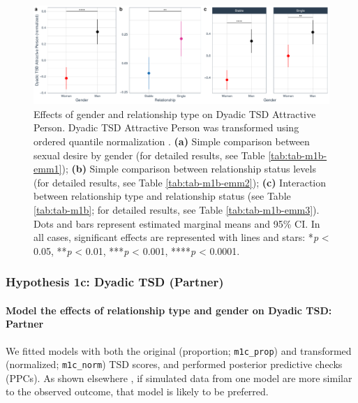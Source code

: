 \documentclass[
  bookmarksnumbered]{article}
\begin{document}
\begin{figure}
\centering
\includegraphics{Sexual_Desire_Arousal_files/figure-latex/fig-h1b-1.pdf}
\caption{\label{fig:fig-h1b}Effects of gender and relationship type on Dyadic TSD Attractive Person. Dyadic TSD Attractive Person was transformed using ordered quantile normalization \autocite{petersonOrderedQuantileNormalization2020a}. \textbf{(a)} Simple comparison between sexual desire by gender (for detailed results, see Table \ref{tab:tab-m1b-emm1}); \textbf{(b)} Simple comparison between relationship status levels (for detailed results, see Table \ref{tab:tab-m1b-emm2}); \textbf{(c)} Interaction between relationship type and relationship status (see Table \ref{tab:tab-m1b}; for detailed results, see Table \ref{tab:tab-m1b-emm3}). Dots and bars represent estimated marginal means and 95\% CI. In all cases, significant effects are represented with lines and stars: *\emph{p} \textless{} 0.05, **\emph{p} \textless{} 0.01, ***\emph{p} \textless{} 0.001, ****\emph{p} \textless{} 0.0001.}
\end{figure}

\subsubsection{Hypothesis 1c: Dyadic TSD (Partner)}\label{hypothesis1c}

\paragraph{Model the effects of relationship type and gender on Dyadic TSD: Partner}\label{model-the-effects-of-relationship-type-and-gender-on-dyadic-tsd-partner}

We fitted models with both the original (proportion; \texttt{m1c\_prop}) and transformed (normalized; \texttt{m1c\_norm}) TSD scores, and performed posterior predictive checks (PPCs). As shown elsewhere \autocite[e.g.,][]{gabryVisualizationBayesianWorkflow2019}, if simulated data from one model are more similar to the observed outcome, that model is likely to be preferred.
\end{document}
